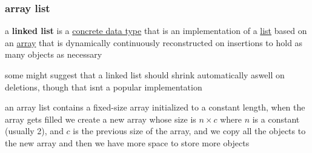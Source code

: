 \documentclass[a4paper,12pt]{article}
\begin{document}
\subsubsection{array list}
\label{sec:orgd284d9b}
\begin{definition}
a \textbf{linked list} is a \hyperref[sec:org39a1299]{concrete data type} that is an implementation of a \hyperref[sec:org250337b]{list} based on an \href{20220728190531-array.org}{array} that is dynamically continuously reconstructed on insertions to hold as many objects as necessary\\[0pt]

\begin{note}
some might suggest that a linked list should shrink automatically aswell on deletions, though that isnt a popular implementation\\[0pt]
\end{note}

\begin{characteristic}
an array list contains a fixed-size array initialized to a constant length, when the array gets filled we create a new array whose size is \(n \times c\) where \(n\) is a constant (usually 2), and \(c\) is the previous size of the array, and we copy all the objects to the new array and then we have more space to store more objects\\[0pt]
\end{characteristic}
\end{definition}
\end{document}
